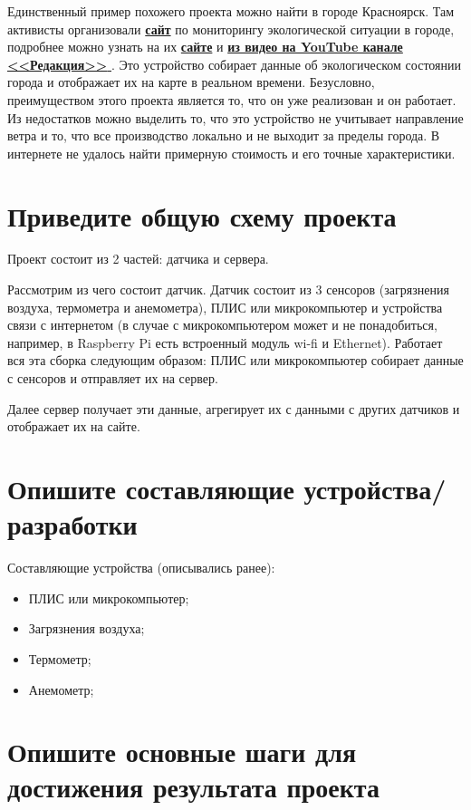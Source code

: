 \documentclass[a4paper,14pt]{article}
\begin{document}
Единственный пример похожего проекта можно найти в городе Красноярск.
Там активисты организовали \href{http://air.krasn.ru/map.html}{\textbf{сайт}} по мониторингу экологической ситуации в городе, подробнее можно узнать на их \href{http://air.krasn.ru/map.html}{\textbf{сайте}} и \href{https://www.youtube.com/watch?v=TdJVDiakvSk}{\textbf{из видео на YouTube канале <<Редакция>> }}. Это устройство собирает данные об экологическом состоянии города и отображает их на карте в реальном времени. Безусловно, преимуществом этого проекта является то, что он уже реализован и он работает.
Из недостатков можно выделить то, что это устройство не учитывает направление ветра и то, что все производство локально и не выходит за пределы города.
В интернете не удалось найти примерную стоимость и его точные характеристики.

\section{ Приведите общую схему проекта}

Проект состоит из 2 частей: датчика и сервера.

Рассмотрим из чего состоит датчик. Датчик состоит из 3 сенсоров (загрязнения воздуха, термометра и анемометра), ПЛИС или микрокомпьютер и устройства связи с интернетом (в случае с микрокомпьютером может и не понадобиться, например, в Raspberry Pi есть встроенный модуль wi-fi и Ethernet).
Работает вся эта сборка следующим образом: ПЛИС или микрокомпьютер собирает данные с сенсоров и отправляет их на сервер.

Далее сервер получает эти данные, агрегирует их с данными с других датчиков и отображает их на сайте.

\section{ Опишите составляющие устройства/разработки}

Составляющие устройства (описывались ранее):

\begin{itemize}
	\item ПЛИС или микрокомпьютер;
	\item Загрязнения воздуха;
	\item Термометр;
	\item Анемометр;
\end{itemize}


\section{ Опишите основные шаги для достижения результата проекта}
\end{document}
